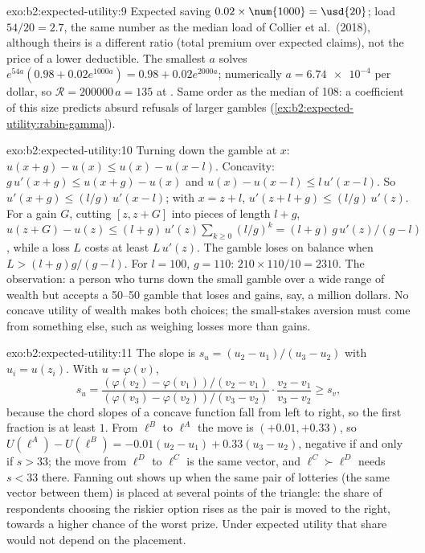 \begin{solution}{exo:b2:expected-utility:9}
Expected saving $0.02 \times \num{1000} = \usd{20}$; load $54/20 = 2.7$, the same number as the median load of
Collier et al.\ (2018), although theirs is a different ratio (total premium over expected claims), not the price of a
lower deductible. The smallest $a$ solves $e^{54a}(0.98 + 0.02e^{1000a}) = 0.98 + 0.02e^{2000a}$; numerically
$a = \num{6.74e-4}$ per dollar, so $\mathcal{R} = \num{200000}\,a = 135$ at . Same order as
the median of 108: a coefficient of this size predicts absurd refusals of larger gambles
(\cref{ex:b2:expected-utility:rabin-gamma}).
\end{solution}

\begin{solution}{exo:b2:expected-utility:10}
Turning down the gamble at $x$: $u(x + g) - u(x) \le u(x) - u(x - l)$. Concavity: $g\,u'(x + g) \le u(x
+ g) - u(x)$ and $u(x) - u(x - l) \le l\,u'(x - l)$. So $u'(x + g) \le (l/g)\,u'(x - l)$; with $x = z +
l$, $u'(z + l + g) \le (l/g)\,u'(z)$. For a gain $G$, cutting $[z, z + G]$ into pieces of length $l +
g$, $u(z + G) - u(z) \le (l + g)\,u'(z)\sum_{k \ge 0}(l/g)^k = (l + g)\,g\,u'(z)/(g - l)$, while a loss
$L$ costs at least $L\,u'(z)$. The gamble loses on balance when $L > (l + g)g/(g - l)$. For $l = 100$,
$g = 110$: $210 \times 110/10 = \num{2310}$. The observation: a person who turns down the small gamble
over a wide range of wealth but accepts a 50--50 gamble that loses  and gains, say, a million
dollars. No concave utility of wealth makes both choices; the small-stakes aversion must come from
something else, such as weighing losses more than gains.
\end{solution}

\begin{solution}{exo:b2:expected-utility:11}
The slope is $s_u = (u_2 - u_1)/(u_3 - u_2)$ with $u_i = u(z_i)$. With $u = \varphi(v)$,
\[
s_u = \frac{(\varphi(v_2) - \varphi(v_1))/(v_2 - v_1)}{(\varphi(v_3) - \varphi(v_2))/(v_3 - v_2)} \cdot
\frac{v_2 - v_1}{v_3 - v_2} \ge s_v,
\]
because the chord slopes of a concave function fall from left to right, so the first fraction is at
least $1$. From $\ell^{B}$ to $\ell^{A}$ the move is $(+0.01, +0.33)$, so $U(\ell^{A}) - U(\ell^{B}) =
-0.01(u_2 - u_1) + 0.33(u_3 - u_2)$, negative if and only if $s > 33$; the move from $\ell^{D}$ to
$\ell^{C}$ is the same vector, and $\ell^{C} \succ \ell^{D}$ needs $s < 33$ there. Fanning out shows up
when the same pair of lotteries (the same vector between them) is placed at several points of the
triangle: the share of respondents choosing the riskier option rises as the pair is moved to the right,
towards a higher chance of the worst prize. Under expected utility that share would not depend on the
placement.
\end{solution}

